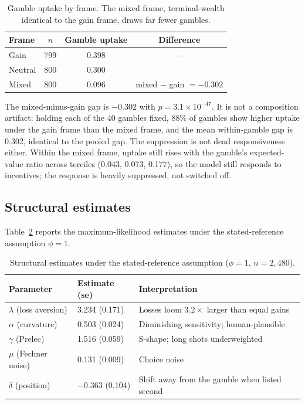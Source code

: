 \documentclass[11pt]{article}
\begin{document}
\begin{table}[h]
\centering
\caption{Gamble uptake by frame. The mixed frame, terminal-wealth identical to the gain frame, draws
far fewer gambles.}
\label{tab:gap}
\begin{tabular}{@{}lccc@{}}
\toprule
Frame & $n$ & Gamble uptake & Difference \\
\midrule
Gain    & 799 & 0.398 & --- \\
Neutral & 800 & 0.300 & \\
Mixed   & 800 & 0.096 & mixed $-$ gain $= -0.302$ \\
\bottomrule
\end{tabular}
\end{table}

The mixed-minus-gain gap is $-0.302$ with $p = 3.1\times10^{-47}$. It is not a composition artifact:
holding each of the 40 gambles fixed, 88\% of gambles show higher uptake under the gain frame than the
mixed frame, and the mean within-gamble gap is 0.302, identical to the pooled gap. The suppression is
not dead responsiveness either. Within the mixed frame, uptake still rises with the gamble's expected-
value ratio across terciles (0.043, 0.073, 0.177), so the model still responds to incentives; the
response is heavily suppressed, not switched off.

\subsection{Structural estimates}
Table~\ref{tab:params} reports the maximum-likelihood estimates under the stated-reference assumption
$\phi = 1$.

\begin{table}[h]
\centering
\caption{Structural estimates under the stated-reference assumption ($\phi = 1$, $n = 2{,}480$).}
\label{tab:params}
\begin{tabular}{@{}lll@{}}
\toprule
Parameter & Estimate (se) & Interpretation \\
\midrule
$\lambda$ (loss aversion) & 3.234 (0.171) & Losses loom $3.2\times$ larger than equal gains \\
$\alpha$ (curvature)      & 0.503 (0.024) & Diminishing sensitivity; human-plausible \\
$\gamma$ (Prelec)         & 1.516 (0.059) & S-shape; long shots underweighted \\
$\mu$ (Fechner noise)     & 0.131 (0.009) & Choice noise \\
$\delta$ (position)       & $-0.363$ (0.104) & Shift away from the gamble when listed second \\
\bottomrule
\end{tabular}
\end{table}
\end{document}
